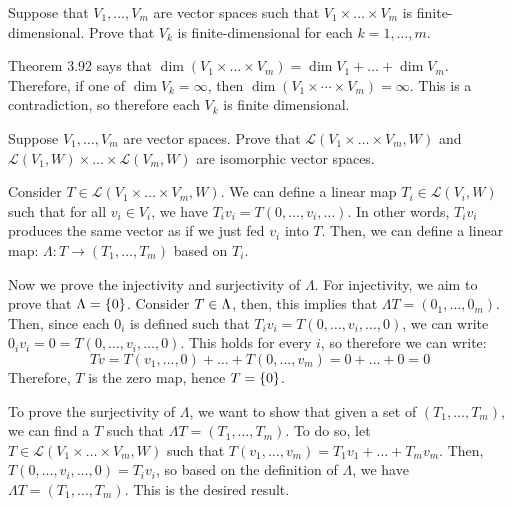 \documentclass[10pt]{article}
\begin{document}
	\begin{problem}
		Suppose that \( V_1, \dots, V_m \) are vector spaces such that \( V_1 \times  \dots \times  V_m \) 
		is finite-dimensional. Prove that \( V_k \) is finite-dimensional for each \( k = 1, \dots, m \). 
	\end{problem}

	\begin{solution}
		Theorem 3.92 says that \( \dim(V_1 \times \dots \times V_m) = \dim V_1 + \dots + \dim V_m \). Therefore, 
		if one of \( \dim V_k = \infty\), then \( \dim(V_1 \times \cdots \times V_m) = \infty \). This is a 
		contradiction, so therefore each \( V_k \) is finite dimensional. 
	\end{solution}

	\begin{problem}
		Suppose \( V_1, \dots, V_m \) are vector spaces. Prove that 
		\( \mathcal L(V_1 \times \dots \times V_m, W) \) and \( \mathcal L(V_1, W) \times  \dots \times 
		\mathcal L(V_m, W)\) are isomorphic vector spaces. 
	\end{problem}

	\begin{solution}
		Consider \( T \in \mathcal L(V_1 \times \dots \times V_m, W) \). 
		We can define a linear map \( T_i \in  \mathcal L(V_i, W) \) such that for all \( v_i \in V_i \), 
		we have \( T_i v_i = T(0, \dots, v_i, \dots) \). In other words, \( T_i v_i \) produces the same 
		vector as if we just fed \( v_i \) into \( T \). Then, we can define a linear map:
		\( \Lambda: T \to (T_1, \dots, T_m )\) based on \( T_i  \). 	

		Now we prove the injectivity and surjectivity of \( \Lambda \). For injectivity, we aim to prove that 
		\( \null \Lambda = \{ 0\}  \). Consider \( T \in \null \Lambda \), then, this implies that 
		\( \Lambda T = (0_1, \dots, 0_m) \). Then, since each \( 0_i \) is defined such that 
		\( T_i v_i = T(0, \dots, v_i, \dots, 0) \), we can write \( 0_i v_i = 0 = T(0, \dots, v_i, \dots, 0) \). 
		This holds for every \( i \), so therefore we can write:
		\[
		T v = T(v_1, \dots, 0) + \dots + T(0, \dots, v_m) = 0 + \dots + 0 = 0
		\] 
		Therefore, \( T  \) is the zero map, hence \( \null T = \{0\}  \). 

		To prove the surjectivity of \( \Lambda \), we want to show that given a set of \( (T_1, \dots, T_m) \), 
		we can find a \( T \) such that \( \Lambda T = (T_1, \dots, T_m) \). To do so, let 
		\( T \in \mathcal L(V_1 \times \dots \times V_m, W) \) such that \( T(v_1, \dots, v_m) = 
		T_1v_1 + \dots + T_m v_m\). Then, \( T(0, \dots, v_i, \dots, 0) = T_i v_i \), so based on the 
		definition of \( \Lambda \), we have \( \Lambda T = (T_1, \dots, T_m) \). This is 
		the desired result. 
	\end{solution}
\end{document}
